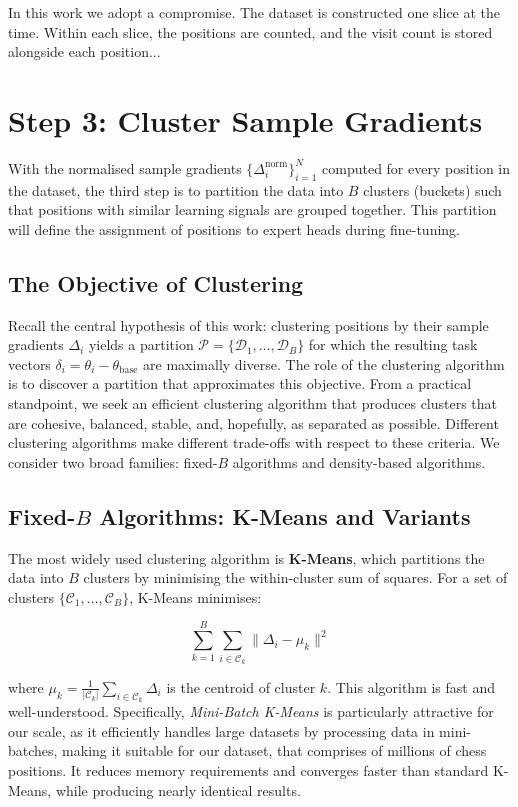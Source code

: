 In this work we adopt a compromise. The dataset is constructed one slice at the time. Within each slice, the positions are counted, and the visit count is stored alongside each position...



\section{Step 3: Cluster Sample Gradients}

With the normalised sample gradients $\{\Delta_i^{\text{norm}}\}_{i=1}^N$ computed for every position in the dataset, the third step is to partition the data into $B$ clusters (buckets) such that positions with similar learning signals are grouped together. This partition will define the assignment of positions to expert heads during fine-tuning.

\subsection{The Objective of Clustering}

Recall the central hypothesis of this work: clustering positions by their sample gradients $\Delta_i$ yields a partition $\mathcal{P} = \{\mathcal{D}_1, \dots, \mathcal{D}_B\}$ for which the resulting task vectors $\delta_i = \theta_i - \theta_{\text{base}}$ are maximally diverse. The role of the clustering algorithm is to discover a partition that approximates this objective. From a practical standpoint, we seek an efficient clustering algorithm that produces clusters that are cohesive, balanced, stable, and, hopefully, as separated as possible. Different clustering algorithms make different trade-offs with respect to these criteria. We consider two broad families: fixed-$B$ algorithms and density-based algorithms.

\subsection{Fixed-$B$ Algorithms: K-Means and Variants}

The most widely used clustering algorithm is \textbf{K-Means}, which partitions the data into $B$ clusters by minimising the within-cluster sum of squares. For a set of clusters $\{\mathcal{C}_1, \dots, \mathcal{C}_B\}$, K-Means minimises:

\[\sum_{k=1}^B \sum_{i \in \mathcal{C}_k} \|\Delta_i - \mu_k\|^2\]

where $\mu_k = \frac{1}{|\mathcal{C}_k|} \sum_{i \in \mathcal{C}_k} \Delta_i$ is the centroid of cluster $k$. This algorithm is fast and well-understood. Specifically, \emph{Mini-Batch K-Means} is particularly attractive for our scale, as it efficiently handles large datasets by processing data in mini-batches, making it suitable for our dataset, that comprises of millions of chess positions. It reduces memory requirements and converges faster than standard K-Means, while producing nearly identical results.

